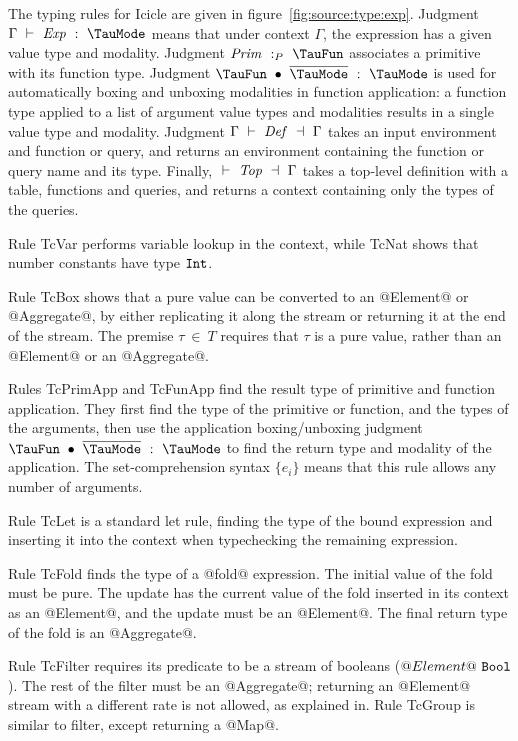 The typing rules for Icicle are given in figure~\ref{fig:source:type:exp}.
Judgment $\Typecheck{\Gamma}{\mi{Exp}}{\TauMode}$ means that under context $\Gamma$, the expression has a given value type and modality.
Judgment $\TypecheckP{\mi{Prim}}{\TauFun}$ associates a primitive with its function type.
Judgment $\TypecheckApp{\TauFun}{\ov{\TauMode}}{\TauMode}$ is used for automatically boxing and unboxing modalities in function application: a function type applied to a list of argument value types and modalities results in a single value type and modality.
Judgment $\TypecheckS{\Gamma}{\mi{Def}}{\Gamma}$ takes an input environment and function or query, and returns an environment containing the function or query name and its type.
Finally, $\TypecheckS{}{\mi{Top}}{\Gamma}$ takes a top-level definition with a table, functions and queries, and returns a context containing only the types of the queries.

Rule TcVar performs variable lookup in the context, while TcNat shows that number constants have type $\mathtt{Int}$.

Rule TcBox shows that a pure value can be converted to an @Element@ or @Aggregate@, by either replicating it along the stream or returning it at the end of the stream.
The premise $\tau~\in~T$ requires that $\tau$ is a pure value, rather than an @Element@ or an @Aggregate@.

Rules TcPrimApp and TcFunApp find the result type of primitive and function application.
They first find the type of the primitive or function, and the types of the arguments, then use the application boxing/unboxing judgment $\TypecheckApp{\TauFun}{\ov{\TauMode}}{\TauMode}$ to find the return type and modality of the application.
The set-comprehension syntax $\{e_i\}$ means that this rule allows any number of arguments.

Rule TcLet is a standard let rule, finding the type of the bound expression and inserting it into the context when typechecking the remaining expression.

Rule TcFold finds the type of a @fold@ expression.
The initial value of the fold must be pure.
The update has the current value of the fold inserted in its context as an @Element@, and the update must be an @Element@.
The final return type of the fold is an @Aggregate@.

Rule TcFilter requires its predicate to be a stream of booleans ($@Element@~\mathtt{Bool}$).
The rest of the filter must be an @Aggregate@; returning an @Element@ stream with a different rate is not allowed, as explained in.
Rule TcGroup is similar to filter, except returning a @Map@.

